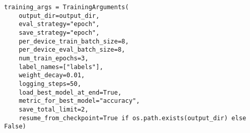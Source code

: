 \begin{lstlisting}[style=mypython, caption={Training Arguments}]
training_args = TrainingArguments(
    output_dir=output_dir,
    eval_strategy="epoch",
    save_strategy="epoch",
    per_device_train_batch_size=8,
    per_device_eval_batch_size=8,
    num_train_epochs=3,
    label_names=["labels"], 
    weight_decay=0.01,
    logging_steps=50,
    load_best_model_at_end=True,
    metric_for_best_model="accuracy",
    save_total_limit=2,
    resume_from_checkpoint=True if os.path.exists(output_dir) else False)
\end{lstlisting}
